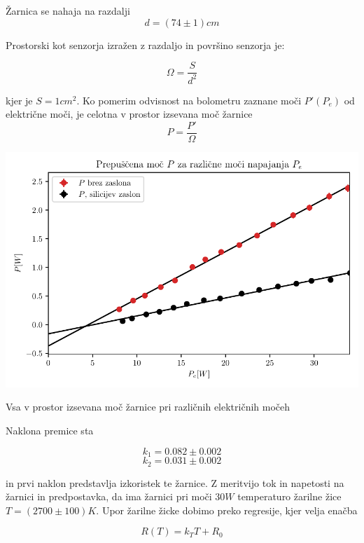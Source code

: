 \documentclass[12pt]{report}
\begin{document}
Žarnica se nahaja na razdalji 
\[
d = (74 \pm 1) cm
\]

Prostorski kot senzorja izražen z razdaljo in površino senzorja je: 

\begin{equation}
  \Omega = \frac{S}{d^2}
\end{equation}

kjer je $S = 1 \si{cm^2}$. Ko pomerim odvisnost na bolometru zaznane moči $P'(P_e)$ od električne moči, je celotna v prostor izsevana moč žarnice 
\begin{equation}
  P = \frac{P'}{\Omega}
\end{equation}

\begin{slika}[H]
  \centering
  \includegraphics{PPe}
  \caption{\small Vsa v prostor izsevana moč žarnice pri različnih električnih močeh}
  \label{fig:PPe}
\end{slika}

Naklona premice sta 

\[
k_1 = 0.082 \pm 0.002 
\]
\[
k_2 = 0.031 \pm 0.002  
\]

in prvi naklon predstavlja izkoristek te žarnice. Z meritvijo tok in napetosti na žarnici in predpostavka, da ima žarnici pri moči $30 \si{W}$ temperaturo žarilne žice $T = (2700 \pm 100) \si{K}$. Upor žarilne žicke dobimo preko regresije, kjer velja enačba 

\begin{equation}
  R(T) = k_T T + R_0
\end{equation}
\end{document}

